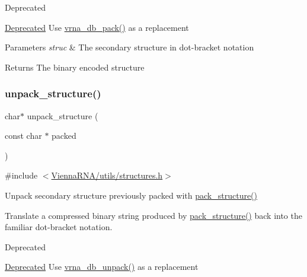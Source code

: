 \begin{DoxyRefDesc}{Deprecated}
\item[\hyperlink{deprecated__deprecated000183}{Deprecated}]Use \hyperlink{group__struct__utils__dot__bracket_ga55c4783060a1464f862f858d5599c9e1}{vrna\+\_\+db\+\_\+pack()} as a replacement\end{DoxyRefDesc}

\begin{DoxyParams}{Parameters}
{\em struc} & The secondary structure in dot-\/bracket notation \\
\hline
\end{DoxyParams}
\begin{DoxyReturn}{Returns}
The binary encoded structure 
\end{DoxyReturn}
\mbox{\label{group__struct__utils__deprecated_ga071c6921efe1eb974f115ee6fefa3c39}} 
\subsubsection{\texorpdfstring{unpack\+\_\+structure()}{unpack\_structure()}}
{\footnotesize\ttfamily char$\ast$ unpack\+\_\+structure (\begin{DoxyParamCaption}\item[{const char $\ast$}]{packed }\end{DoxyParamCaption})}



{\ttfamily \#include $<$\hyperlink{utils_2structures_8h}{Vienna\+R\+N\+A/utils/structures.\+h}$>$}



Unpack secondary structure previously packed with \hyperlink{group__struct__utils__deprecated_gac6dfa5e22928c087c6e09ff0054a7ced}{pack\+\_\+structure()} 

Translate a compressed binary string produced by \hyperlink{group__struct__utils__deprecated_gac6dfa5e22928c087c6e09ff0054a7ced}{pack\+\_\+structure()} back into the familiar dot-\/bracket notation.

\begin{DoxyRefDesc}{Deprecated}
\item[\hyperlink{deprecated__deprecated000184}{Deprecated}]Use \hyperlink{group__struct__utils__dot__bracket_ga6490adff857d84ce06e6f379ae3a4512}{vrna\+\_\+db\+\_\+unpack()} as a replacement\end{DoxyRefDesc}

